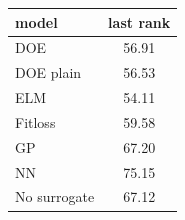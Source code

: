 \begin{tabular}{|lc|}
\hline
model & last rank\\
\hline
DOE & 56.91 \\
DOE plain & 56.53 \\
ELM & 54.11 \\
Fitloss & 59.58 \\
GP & 67.20 \\
NN & 75.15 \\
No surrogate & 67.12 \\
\hline
\end{tabular}
